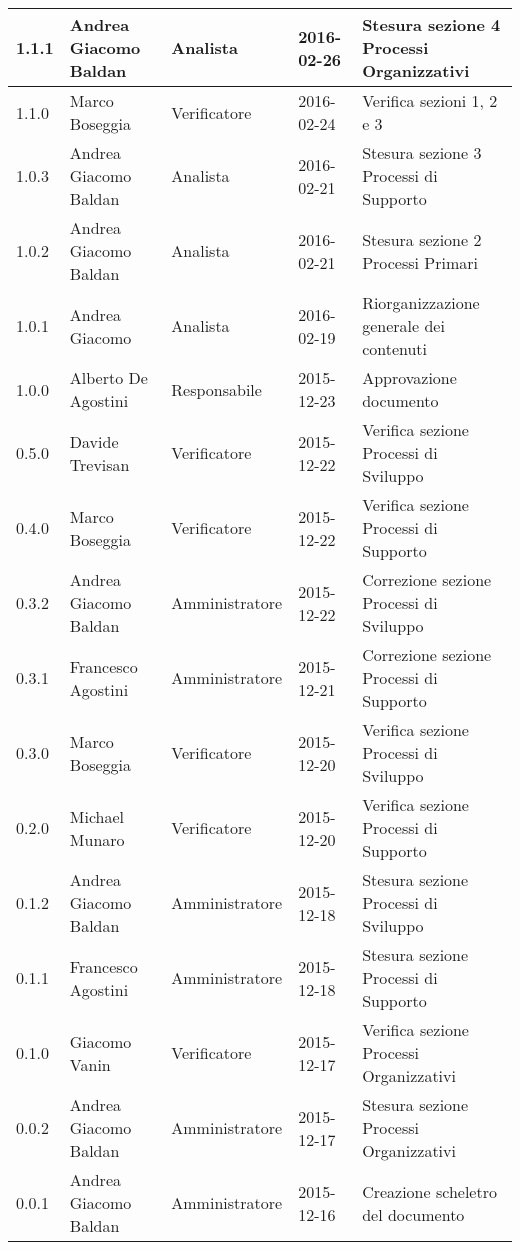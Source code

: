 \documentclass{scalatekids-article}
\begin{document}
\begin{center}
\begin{longtable}{| l | l | l | l | p{5cm} |}
    \hline
    1.1.1 & Andrea Giacomo Baldan & Analista & 2016-02-26 & Stesura sezione 4 Processi Organizzativi\\
    \hline
    1.1.0 & Marco Boseggia & Verificatore & 2016-02-24 & Verifica sezioni 1, 2 e 3\\
    \hline
    1.0.3 & Andrea Giacomo Baldan & Analista & 2016-02-21 & Stesura sezione 3 Processi di Supporto\\
    \hline
    1.0.2 & Andrea Giacomo Baldan & Analista & 2016-02-21 & Stesura sezione 2 Processi Primari\\
    \hline
    1.0.1 & Andrea Giacomo & Analista & 2016-02-19 & Riorganizzazione generale dei contenuti\\
    \hline
    1.0.0 & Alberto De Agostini & Responsabile & 2015-12-23 & Approvazione documento\\
    \hline
    0.5.0 & Davide Trevisan & Verificatore & 2015-12-22 & Verifica sezione Processi di Sviluppo\\
    \hline
    0.4.0 & Marco Boseggia & Verificatore & 2015-12-22 & Verifica sezione Processi di Supporto\\
    \hline
    0.3.2 & Andrea Giacomo Baldan & Amministratore & 2015-12-22 & Correzione sezione Processi di Sviluppo\\
    \hline
    0.3.1 & Francesco Agostini & Amministratore & 2015-12-21 & Correzione sezione Processi di Supporto\\
    \hline
    0.3.0 & Marco Boseggia & Verificatore & 2015-12-20 & Verifica sezione Processi di Sviluppo\\
    \hline
    0.2.0 & Michael Munaro & Verificatore & 2015-12-20 & Verifica sezione Processi di Supporto\\
    \hline
    0.1.2 & Andrea Giacomo Baldan & Amministratore & 2015-12-18 & Stesura sezione Processi di Sviluppo\\
    \hline
    0.1.1 & Francesco Agostini & Amministratore & 2015-12-18 & Stesura sezione Processi di Supporto\\
    \hline
    0.1.0 & Giacomo Vanin & Verificatore & 2015-12-17 & Verifica sezione Processi Organizzativi\\
    \hline
    0.0.2 & Andrea Giacomo Baldan & Amministratore & 2015-12-17 & Stesura sezione Processi Organizzativi\\
    \hline
    0.0.1 & Andrea Giacomo Baldan & Amministratore & 2015-12-16 & Creazione scheletro del documento\\
    \hline
  \end{longtable}
\end{center}
\tableofcontents
\newpage
{}
\end{document}
